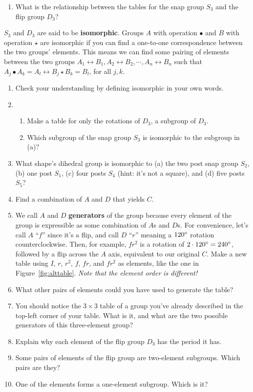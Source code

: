 \documentclass[../gatm.tex]{subfiles}
\begin{document}
%
\begin{enumerate}
\setcounter{enumi}{\theenumLast}
\item What is the relationship between the tables for the snap group $S_3$ and the flip group $D_3$?
\setcounter{enumLast}{\theenumi}
\end{enumerate}
$S_3$ and $D_3$ are said to be \textbf{isomorphic}. Groups $A$ with operation $\bullet$ and $B$ with operation $\star$ are isomorphic if you can find a one-to-one correspondence between the two groups' elements. This means we can find some pairing of elements between the two groups $A_1\leftrightarrow B_1, A_2\leftrightarrow B_2, \cdots, A_n \leftrightarrow B_n$ such that $A_j \bullet A_k = A_l \leftrightarrow B_j \star B_k = B_l$, for all $j,k$.
\begin{enumerate}
\setcounter{enumi}{\theenumLast}
\item Check your understanding by defining isomorphic in your own words.
\item \begin{enumerate}
\item Make a table for only the rotations of $D_3$, a subgroup of $D_3$.
\item Which subgroup of the snap group $S_3$ is isomorphic to the subgroup in (a)?
\end{enumerate}
\item What shape's dihedral group is isomorphic to (a) the two post snap group $S_2$, (b) one post $S_1$, (c) four posts $S_4$ (hint: it's not a square), and (d) five posts $S_5$?
\item Find a combination of $A$ and $D$ that yields $C$.
\item We call $A$ and $D$ \textbf{generators} of the group because every element of the group is expressible as some combination of $A$s and $D$s. For convenience, let's call $A$ ``$f$'' since it's a flip, and call $D$ ``$r$'' meaning a $120^\circ$ rotation counterclockwise. Then, for example, $fr^2$ is a rotation of $2\cdot 120^\circ = 240^\circ$, followed by a flip across the $A$ axis, equivalent to our original $C$. Make a new table using $I$, $r$, $r^2$, $f$, $fr$, and $fr^2$ as elements, like the one in Figure~\ref{fig:alttable}. \textit{Note that the element order is different!}
\item What other pairs of elements could you have used to generate the table?
\item You should notice the $3\times 3$ table of a group you've already described in the top-left corner of your table. What is it, and what are the two possible generators of this three-element group?
\item Explain why each element of the flip group $D_3$ has the period it has.
\item Some pairs of elements of the flip group are two-element subgroups. Which pairs are they?
\item One of the elements forms a one-element subgroup. Which is it?
\setcounter{enumLast}{\theenumi}
\end{enumerate}
\end{document}
